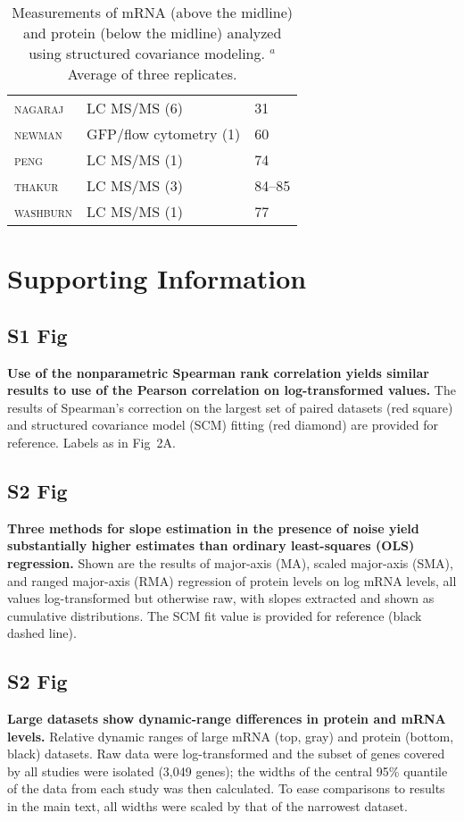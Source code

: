 \documentclass[10pt]{article}
\begin{document}
\begin{table}[!ht]
\begin{tabular}{lll}
\textsc{nagaraj} \cite{nagaraj12}       & LC MS/MS (6)              & 31     \\
\textsc{newman} \cite{newman06}         & GFP/flow cytometry (1)    & 60     \\
\textsc{peng} \cite{peng03}             & LC MS/MS (1)              & 74     \\
\textsc{thakur} \cite{thakur11}         & LC MS/MS (3)              & 84--85 \\
\textsc{washburn} \cite{washburn01}     & LC MS/MS (1)              & 77     \\
\hline
\end{tabular}
\caption{Measurements of mRNA (above the midline) and protein
(below the midline) analyzed using structured covariance modeling. $^a$Average of three replicates.\label{tab:data}} 

\end{table}


\section*{Supporting Information}
\subsection*{S1 Fig}
\label{S1_Fig}
{\bf Use of the nonparametric Spearman rank correlation yields similar results to use of the Pearson correlation on log-transformed values.}  The results of Spearman's correction on the largest set of paired datasets (red square) and structured covariance model (SCM) fitting (red diamond) are provided for reference. Labels as in Fig~2A.

\subsection*{S2 Fig}
\label{S2_Fig}
{\bf Three methods for slope estimation in the presence of noise yield substantially higher estimates than ordinary least-squares (OLS) regression.} Shown are the results of major-axis (MA), scaled major-axis (SMA), and ranged major-axis (RMA) regression of protein levels on log mRNA levels, all values log-transformed but otherwise raw, with slopes extracted and shown as cumulative distributions. The SCM fit value is provided for reference (black dashed line).

\subsection*{S2 Fig}
\label{S3_Fig}
{\bf Large datasets show dynamic-range differences in protein and mRNA levels.} Relative dynamic ranges of large mRNA (top, gray) and protein (bottom, black) datasets. Raw data were log-transformed and the subset of genes covered by all studies were isolated (3,049 genes); the widths of the central 95\% quantile of the data from each study was then calculated. To ease comparisons to results in the main text, all widths were scaled by that of the narrowest dataset.
\end{document}
